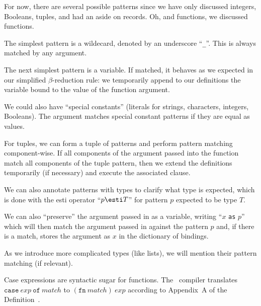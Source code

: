 \begin{node}
\begin{node}
For now, there are several possible patterns since we have only
discussed integers, Booleans, tuples, and had an aside on records. Oh,
and functions, we discussed functions.

The simplest pattern is a wildecard, denoted by an underscore ``\verb|_|''.
This is always matched by any argument.

The next simplest pattern is a variable. If matched, it behaves as we
expected in our simplified $\beta$-reduction rule: we temporarily append
to our definitions the variable bound to the value of the function argument.

We could also have ``special constants'' (literals for strings,
characters, integers, Booleans). The argument matches special constant
patterns if they are equal as values.

For tuples, we can form a tuple of patterns and perform pattern matching
component-wise. If all components of the argument passed into the
function match all components of the tuple pattern, then we extend the
definitions temporarily (if necessary) and execute the associated
clause.

We can also annotate patterns with types to clarify what type is
expected, which is done with the esti operator ``$p\esti T$'' for
pattern $p$ expected to be type $T$.

We can also ``preserve'' the argument passed in as a variable, writing
``$x$ \texttt{as} $p$'' which will then match the argument passed in
against the pattern $p$ and, if there is a match, stores the argument as
$x$ in the dictionary of bindings.

As we introduce more complicated types (like lists), we will mention
their pattern matching (if relevant).
\end{node}

\begin{node}[Remark]\label{sml-000K}%
Case expressions are syntactic sugar for functions. The \SML\ compiler
translates $\mathtt{case}~exp~\mathtt{of}~match$ to $(\mathtt{fn}~match)~exp$
according to Appendix~A of the Definition~\cite{milner1997definition}.
\end{node}
\end{node}
